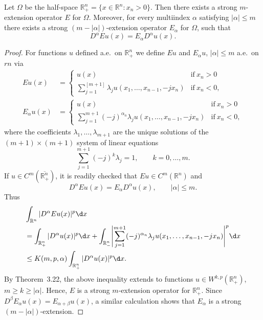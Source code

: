 \begin{theorem}
  Let $\Omega$ be the half-space $\mathbb{R}^n_+ = \{x\in \mathbb{R}^n: x_n>0\}$.
  Then there exists a strong $m$-extension operator $E$ for $\Omega$.
  Moreover, for every multiindex $\alpha$ satisfying $|\alpha|\leq m$ there exists
  a strong $(m-|\alpha|)$-extension operator $E_\alpha$ for $\Omega$, such that
  \[ D^\alpha Eu(x) = E_\alpha D^\alpha u(x). \]
\end{theorem}

\begin{proof}
  For functions $u$ defined a.e.~on $\mathbb{R}^n_+$ we define $Eu$ and $E_\alpha u$,
  $|\alpha|\leq m$ a.e.\ on $rn$ via
  \begin{align*}
    Eu(x) & = \begin{cases}
                u(x) & \text{if}\ x_n>0 \\
                \sum_{j=1}^[m+1] \lambda_j u(x_1,\ldots,x_{n-1},-jx_n) & \text{if}\ x_n<0,
              \end{cases} \\
    E_\alpha u(x)
          & = \begin{cases}
                u(x) & \text{if}\ x_n>0 \\
                \sum_{j=1}^{m+1} (-j)^{\alpha_n} \lambda_j u(x_1,\ldots,x_{n-1},-jx_n) & \text{if}\ x_n<0,
              \end{cases}
  \end{align*}
  where the coefficients $\lambda_1,\ldots,\lambda_{m+1}$ are the unique solutions
  of the $(m+1)\times (m+1)$ system of linear equations
  \[ \sum_{j=1}^{m+1} (-j)^k \lambda_j = 1, \qquad k = 0,\ldots,m. \]
  If $u\in C^m(\overline{\mathbb{R}^n_+})$, it is readily checked that
  $Eu\in C^m(\mathbb{R}^n)$ and
  \[ D^\alpha Eu(x) = E_\alpha D^\alpha u(x), \qquad |\alpha|\leq m. \]
  Thus
  \begin{align*}
    & \int_{\mathbb{R}^n} |D^\alpha Eu(x)|^p \d x \\
    & = \int_{\mathbb{R}^n_+} |D^\alpha u(x)|^p \d x
        + \int_{\mathbb{R}^n_-} \Biggl|\sum_{j=1}^{m+1} (-j)^{\alpha_n} \lambda_j
          u(x_1,\ldots,x_{n-1},-jx_n)\Biggr|^p \d x \\
    & \leq K(m,p,\alpha) \int_{\mathbb{R}^n_+} |D^\alpha u(x)|^p \d x.
  \end{align*}
  By Theorem~3.22, the above inequality extends to functions
  $u\in W^{k,p}(\mathbb{R}^n_+)$, $m\geq k\geq |\alpha|$. Hence,
  $E$ is a strong $m$-extension operator for $\mathbb{R}^n_+$.
  Since $D^\beta E_\alpha u(x) = E_{\alpha+\beta}u(x)$, a similar
  calculation shows that $E_\alpha$ is a strong $(m-|\alpha|)$-extension.
\end{proof}

